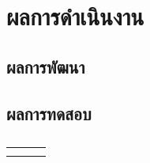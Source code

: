 \chapter{ผลการดำเนินงาน}
\section{ผลการพัฒนา}
\BlankBody
\section{ผลการทดสอบ}
\begin{table}[H]
  \caption{\BlankField[5cm]}
  \label{tab:template}
  \centering
  \begin{tabular}{p{0.28\linewidth}p{0.28\linewidth}p{0.28\linewidth}}
    \toprule
    \strut & & \\
    \midrule
    \rule{0pt}{1cm} & & \\
    \rule{0pt}{1cm} & & \\
    \bottomrule
  \end{tabular}
\end{table}
